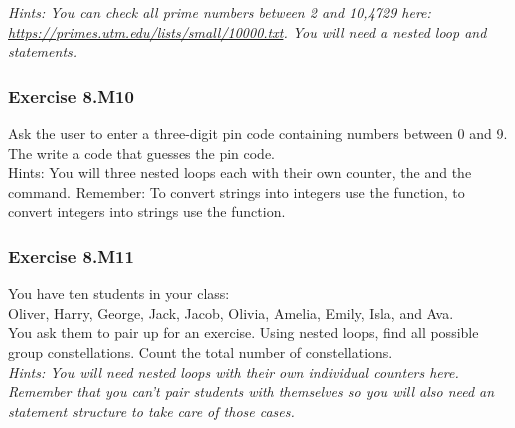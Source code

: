 \textit{Hints:
You can check all prime numbers between 2 and 10,4729 here:
\url{https://primes.utm.edu/lists/small/10000.txt}. You will need a nested loop and {} statements.}\\[1cm]



\subsubsection*{Exercise 8.M10}
Ask the user to enter a three-digit pin code containing numbers between 0 and 9. The write
a code that guesses the pin code.\\


Hints:
You will three nested loops each with their own counter, the {} and the {} command. Remember: To convert strings into integers use the {} function, to convert integers into strings use the {} function.\\[1cm]



\subsubsection*{Exercise 8.M11}
You have ten students in your class:\\
Oliver, Harry, George, Jack, Jacob, Olivia, Amelia, Emily, Isla, and Ava.\\
You ask them to pair up for an exercise. Using nested loops, find all possible group
constellations. Count the total number of constellations.\\


\textit{Hints:
You will need nested loops with their own individual counters here. Remember that you
can’t pair students with themselves so you will also need an {} statement
structure to take care of those cases.}\\[1cm]



